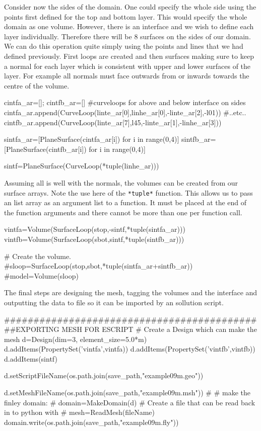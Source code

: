 Consider now the sides of the domain. One could specify the whole side using the
points first defined for the top and bottom layer. This would specify the whole
domain as one volume. However, there is an interface and we wish to define each
layer individually. Therefore there will be 8 surfaces on the sides of our
domain. We can do this operation quite simply using the points and lines that we
had defined previously. First loops are created and then surfaces making sure to
keep a normal for each layer which is consistent with upper and lower surfaces
of the layer. For example all normals must face outwards from or inwards towards
 the centre of the volume.
\begin{python}
cintfa_ar=[]; cintfb_ar=[] #curveloops for above and below interface on sides
cintfa_ar.append(CurveLoop(linte_ar[0],linhe_ar[0],-linte_ar[2],-l01))
#..etc..
cintfb_ar.append(CurveLoop(linte_ar[7],l45,-linte_ar[1],-linhe_ar[3]))

sintfa_ar=[PlaneSurface(cintfa_ar[i]) for i in range(0,4)]
sintfb_ar=[PlaneSurface(cintfb_ar[i]) for i in range(0,4)]

sintf=PlaneSurface(CurveLoop(*tuple(linhe_ar)))
\end{python}
Assuming all is well with the normals, the volumes can be created from our
surface arrays. Note the use here of the \verb!*tuple*! function. This allows us
to pass an list array as an argument list to a function. It must be placed at
the end of the function arguments and there cannot be more than one per function
call.
\begin{python}
vintfa=Volume(SurfaceLoop(stop,-sintf,*tuple(sintfa_ar)))
vintfb=Volume(SurfaceLoop(sbot,sintf,*tuple(sintfb_ar)))

# Create the volume.
#sloop=SurfaceLoop(stop,sbot,*tuple(sintfa_ar+sintfb_ar))
#model=Volume(sloop)
\end{python}
The final steps are designing the mesh, tagging the volumes and the interface
and outputting the data to file so it can be imported by an \esc sollution
script.
\begin{python}
#############################################EXPORTING MESH FOR ESCRIPT
# Create a Design which can make the mesh
d=Design(dim=3, element_size=5.0*m)
d.addItems(PropertySet('vintfa',vintfa))
d.addItems(PropertySet('vintfb',vintfb))
d.addItems(sintf)

d.setScriptFileName(os.path.join(save_path,"example09m.geo"))

d.setMeshFileName(os.path.join(save_path,"example09m.msh"))
#
#  make the finley domain:
#
domain=MakeDomain(d)
# Create a file that can be read back in to python with
# mesh=ReadMesh(fileName)
domain.write(os.path.join(save_path,"example09m.fly"))
\end{python}

